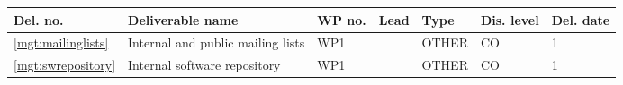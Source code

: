 \documentclass[a4paper,11pt]{article}
\begin{document}
\newpage
{}
\label{sect:deliverables}

\begin{minipage}{\textwidth}
\begin{center}
\begin{tabular}{|p{0.8cm}|p{9.65cm}|p{0.8cm}|p{1.15cm}|p{1.2cm}|p{0.8cm}|p{0.8cm}|}  \hline
\textbf{Del. no.}              & \textbf{Deliverable name}        & \textbf{WP no.} & \textbf{Lead}
& \textbf{Type}              & \textbf{Dis. level}   & \textbf{Del. date}
\\ \hline



\ref{mgt:mailinglists}           & Internal and public mailing lists
                                                                  & WP1 &\coordshort{} & OTHER & CO &  1 \\
\hline \ref{mgt:swrepository} & Internal software repository & WP1 & \coordshort{} & OTHER & CO & 1 \\



\end{tabular}
\end{center}
\end{minipage}
\end{document}
